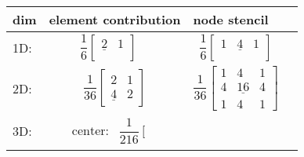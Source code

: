 \begin{table}[h]
\centering
\begin{tabular}{l|l|l|l}
    dim & element contribution & node stencil\\
    \hline
    1D: &
\begin{minipage}{6cm}
  \begin{equation*}
     \dfrac16\left[\begin{array}{ccc}
        \underline{2} & 1\\
    \end{array}\right] \quad 
  \end{equation*}
\end{minipage} 
    &
\begin{minipage}{6cm}
  \begin{equation*}
    \dfrac16\left[\begin{array}{ccc}
        1 & \underline{4} & 1\\
    \end{array}\right]
  \end{equation*}
\end{minipage} 
     \\[4mm]
     \hline
    2D:&
\begin{minipage}{6cm}
  \begin{equation*}
    \dfrac1{36}\left[\begin{array}{ccc}
        2 & 1 \\
        \underline{4} & 2
      \end{array}
    \right]
  \end{equation*}
\end{minipage}  &
\begin{minipage}{6cm}
  \begin{equation*}
      \dfrac1{36}\left[
        \begin{array}{ccc}
          1 & 4 & 1\\
          4 & \underline{16} & 4 \\
          1 & 4 & 1
        \end{array}
      \right]
  \end{equation*}
\end{minipage}  \\[4mm]
    \hline
    3D: &
\begin{minipage}{6cm}
  \begin{equation*}
    \begin{array}{ll}
      \text{center:} &
      \dfrac1{216}\left[\begin{array}{ccc}

\end{array}
\end{array}
\end{equation*}
\end{minipage}
\end{tabular}
\end{table}
